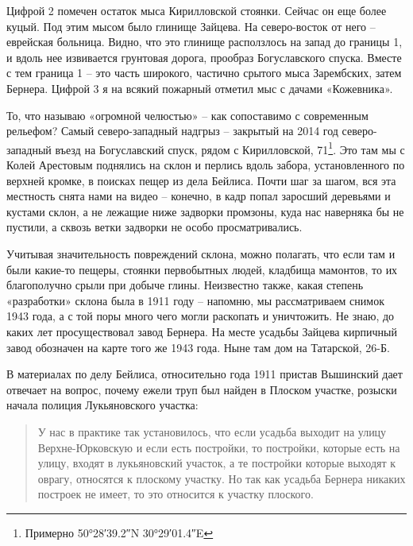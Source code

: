 Цифрой 2 помечен остаток мыса Кирилловской стоянки. Сейчас он еще более куцый. Под этим мысом было глинище Зайцева. На северо-восток от него – еврейская больница. Видно, что это глинище расползлось на запад до границы 1, и вдоль нее извивается грунтовая дорога, прообраз Богуславского спуска. Вместе с тем граница 1 – это часть широкого, частично срытого мыса Зарембских, затем Бернера. Цифрой 3 я на всякий пожарный отметил мыс с дачами «Кожевника».

То, что называю «огромной челюстью» – как сопоставимо с современным рельефом?  Самый северо-западный надгрыз – закрытый на 2014 год северо-западный въезд на Богуславский спуск, рядом с Кирилловской, 71\footnote{Примерно 50°28′39.2″N 30°29′01.4″E}. Это там мы с Колей Арестовым поднялись на склон и перлись вдоль забора, установленного по верхней кромке, в поисках пещер из дела Бейлиса. Почти шаг за шагом, вся эта местность снята нами на видео – конечно, в кадр попал заросший деревьями и кустами склон, а не лежащие ниже задворки промзоны, куда нас наверняка бы не пустили, а сквозь ветки задворки не особо просматривались.

Учитывая значительность повреждений склона, можно полагать, что если там и были какие-то пещеры, стоянки первобытных людей, кладбища мамонтов, то их благополучно срыли при добыче глины. Неизвестно также, какая степень «разработки» склона была в 1911 году – напомню, мы рассматриваем снимок 1943 года, а с той поры много чего могли раскопать и уничтожить. Не знаю, до каких лет просуществовал завод Бернера. На месте усадьбы Зайцева кирпичный завод обозначен на карте того же 1943 года. Ныне там дом на Татарской, 26-Б.

В материалах по делу Бейлиса, относительно года 1911 пристав Вышинский дает отвечает на вопрос, почему ежели труп был найден в Плоском участке, розыски начала полиция Лукьяновского участка:

\begin{quotation}
У нас в практике так установилось, что если усадьба выходит на улицу Верхне-Юрковскую и если есть постройки, то постройки, которые есть на улицу, входят в лукьяновский участок, а те постройки которые выходят к оврагу, относятся к плоскому участку. Но так как усадьба Бернера никаких построек не имеет, то это относится к участку плоского.
\end{quotation}


\newpage


